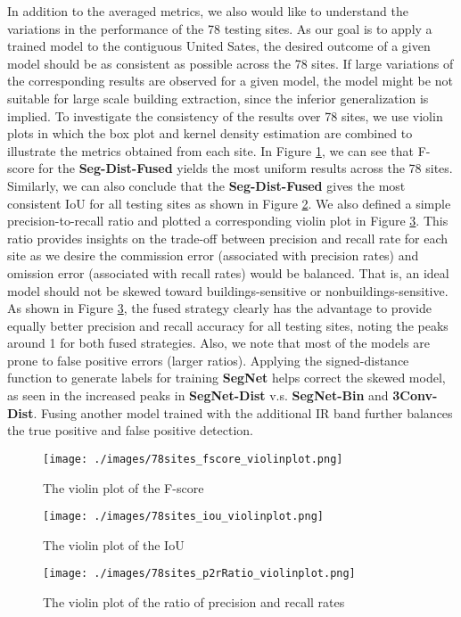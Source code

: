 \documentclass[journal]{IEEEtran}
\begin{document}
In addition to the averaged metrics, we also would like to understand the variations in the performance of the 78 testing sites. As our goal is to apply a trained model to the contiguous United Sates, the desired outcome of a given model should be as consistent as possible across the 78 sites. If large variations of the corresponding results are observed for a given model, the model might be not suitable for large scale building extraction, since the inferior generalization is implied. To investigate the consistency of the results over 78 sites, we use violin plots in which the box plot and kernel density estimation are combined to illustrate the metrics obtained from each site. In Figure \ref{fig:violinplot_fscore}, we can see that F-score for the \textbf{Seg-Dist-Fused} yields the most uniform results across the 78 sites. Similarly, we can also conclude that the \textbf{Seg-Dist-Fused} gives the most consistent IoU for all testing sites as shown in Figure \ref{fig:violinplot_iou}. We also defined a simple precision-to-recall ratio and plotted a corresponding violin plot in Figure \ref{fig:violinplot_p2rRatio}. This ratio provides insights on the trade-off between precision and recall rate for each site as we desire the commission error (associated with precision rates) and omission error (associated with recall rates) would be balanced. That is, an ideal model should not be skewed toward buildings-sensitive or nonbuildings-sensitive. As shown in Figure \ref{fig:violinplot_p2rRatio}, the fused strategy clearly has the advantage to provide equally better precision and recall accuracy for all testing sites, noting the peaks around 1 for both fused strategies. Also, we note that most of the models are prone to false positive errors (larger ratios). Applying the signed-distance function to generate labels for training \textbf{SegNet} helps correct the skewed model, as seen in the increased peaks in \textbf{SegNet-Dist} v.s. \textbf{SegNet-Bin} and \textbf{3Conv-Dist}. Fusing another model trained with the additional IR band further balances the true positive and false positive detection.
\begin{figure}
	\texttt{[image: ./images/78sites\_fscore\_violinplot.png]}
	\caption{The violin plot of the F-score}
	\label{fig:violinplot_fscore}
\end{figure}

\begin{figure}
	\texttt{[image: ./images/78sites\_iou\_violinplot.png]}
	\caption{The violin plot of the IoU}
	\label{fig:violinplot_iou}
\end{figure}
\begin{figure}
	\texttt{[image: ./images/78sites\_p2rRatio\_violinplot.png]}
	\caption{The violin plot of the ratio of precision and recall rates}
	\label{fig:violinplot_p2rRatio}
\end{figure}
\end{document}
